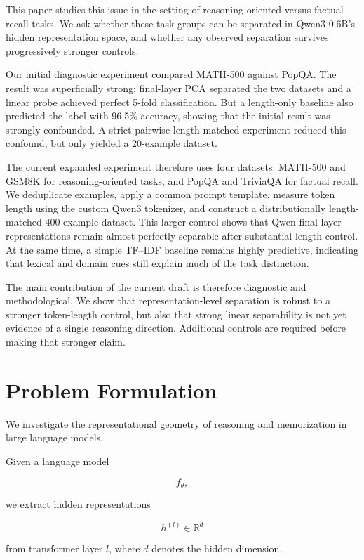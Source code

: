 \documentclass[11pt]{article}
\begin{document}
This paper studies this issue in the setting of reasoning-oriented
versus factual-recall tasks. We ask whether these task groups can be
separated in Qwen3-0.6B's hidden representation space, and whether any
observed separation survives progressively stronger controls.

Our initial diagnostic experiment compared MATH-500 against PopQA.
The result was superficially strong: final-layer PCA separated the two
datasets and a linear probe achieved perfect 5-fold classification.
But a length-only baseline also predicted the label with 96.5\%
accuracy, showing that the initial result was strongly confounded. A
strict pairwise length-matched experiment reduced this confound, but
only yielded a 20-example dataset.

The current expanded experiment therefore uses four datasets:
MATH-500 and GSM8K for reasoning-oriented tasks, and PopQA and TriviaQA
for factual recall. We deduplicate examples, apply a common prompt
template, measure token length using the custom Qwen3 tokenizer, and
construct a distributionally length-matched 400-example dataset. This
larger control shows that Qwen final-layer representations remain
almost perfectly separable after substantial length control. At the
same time, a simple TF--IDF baseline remains highly predictive,
indicating that lexical and domain cues still explain much of the task
distinction.

The main contribution of the current draft is therefore diagnostic and
methodological. We show that representation-level separation is robust
to a stronger token-length control, but also that strong linear
separability is not yet evidence of a single reasoning direction.
Additional controls are required before making that stronger claim.


\section{Problem Formulation}

We investigate the representational geometry of reasoning and
memorization in large language models.

Given a language model

\[
f_{\theta},
\]

we extract hidden representations

\[
h^{(l)} \in \mathbb{R}^{d}
\]

from transformer layer \(l\), where \(d\) denotes the hidden
dimension.
\end{document}
